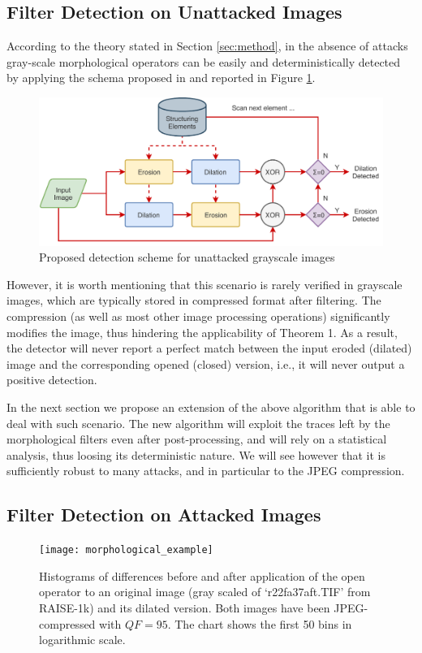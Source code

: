 \documentclass[review]{elsarticle}
\begin{document}
\subsection{Filter Detection on Unattacked Images}

According to the theory stated in Section \ref{sec:method}, in the absence of attacks gray-scale morphological operators can be easily and deterministically detected by applying the schema proposed in \cite{de2017detecting} and reported in Figure \ref{fig:scheme}.

\begin{figure}[!ht]
	\centering
	\includegraphics[width=\linewidth]{diagram1}
	\caption{Proposed detection scheme for unattacked grayscale images}
	\label{fig:scheme}
\end{figure}

However, it is worth mentioning that this scenario is rarely verified in grayscale images, which are typically stored in compressed format after filtering. The compression (as well as most other image processing operations) significantly modifies the image, thus hindering the applicability of Theorem 1. As a result, the detector will never report a perfect match between the input eroded (dilated) image and the corresponding opened (closed) version, i.e., it will never output a positive detection.

In the next section we propose an extension of the above algorithm that is able to deal with such scenario. The new algorithm will exploit the traces left by the morphological filters even after post-processing, and will rely on a statistical analysis, thus loosing its deterministic nature. We will see however that it is sufficiently robust to many attacks, and in particular to the JPEG compression.

\subsection{Filter Detection on Attacked Images}
\label{sec:compr_img}
\begin{figure}[!ht]%
	\centering
	\texttt{[image: morphological\_example]}
	\caption{Histograms of differences before and after application of the open operator to an original image (gray scaled of `r22fa37aft.TIF' from RAISE-1k) and its dilated version. Both images have been JPEG-compressed with $QF = 95$. The chart shows the first 50 bins in logarithmic scale. }
	\label{fig:hist_ero}
\end{figure}
\end{document}
